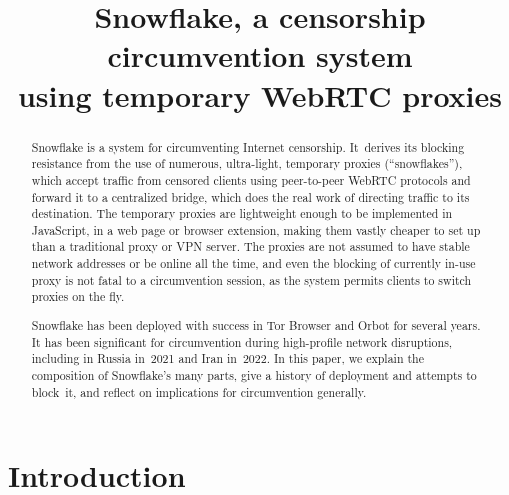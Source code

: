 \documentclass[letterpaper,twocolumn]{article}
\begin{document}
\date{}

\title{Snowflake, a censorship circumvention system \\using temporary WebRTC proxies}

\author{}

\maketitle

\begin{abstract}
Snowflake is a system for circumventing Internet censorship.
It~derives its blocking resistance from
the use of numerous, ultra-light, temporary proxies (``snowflakes''),
which accept traffic from censored clients using peer-to-peer WebRTC protocols
and forward it to a centralized bridge,
which does the real work of directing traffic to its destination.
The temporary proxies are lightweight enough to be implemented in JavaScript,
in a web page or browser extension,
making them vastly cheaper to set up than
a traditional proxy or VPN server.
The proxies are not assumed to have stable network addresses
or be online all the time,
and even the blocking of currently in-use proxy
is not fatal to a circumvention session,
as the system permits clients to switch proxies on the fly.


Snowflake has been deployed with success
in Tor Browser and Orbot for several years.
It has been significant for circumvention
during high-profile network disruptions,
including in Russia in~2021 and Iran in~2022.
In this paper, we explain the composition of Snowflake's many parts,
give a history of deployment and attempts to block~it,
and reflect on implications for circumvention generally.
\end{abstract}


\section{Introduction}
\label{sec:intro}
\end{document}
